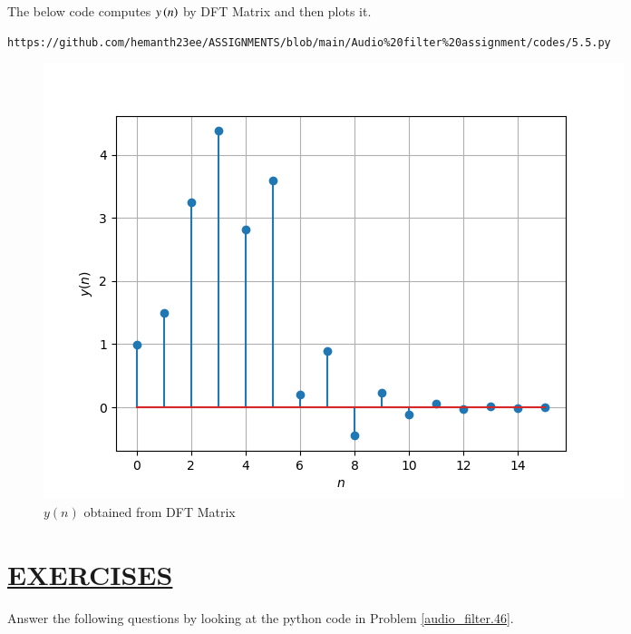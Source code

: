 \documentclass[journal,12pt,twocolumn]{IEEEtran}
\theoremstyle{remark}
\begin{document}
The below code computes $y\left(n\right)$ by DFT Matrix and then plots it.
\begin{lstlisting}
https://github.com/hemanth23ee/ASSIGNMENTS/blob/main/Audio%20filter%20assignment/codes/5.5.py
\end{lstlisting}
\begin{figure}[H]
\centering
\includegraphics[width=\columnwidth]{figs/yn_DFT_matrix.png}
\caption{$y(n)$ obtained from DFT Matrix}
\label{yn_DFT_matrix.46}
\end{figure}

\section{\underline{EXERCISES}}
\noindent Answer the following questions by looking at the python code in Problem \ref{audio_filter.46}.
\end{document}
